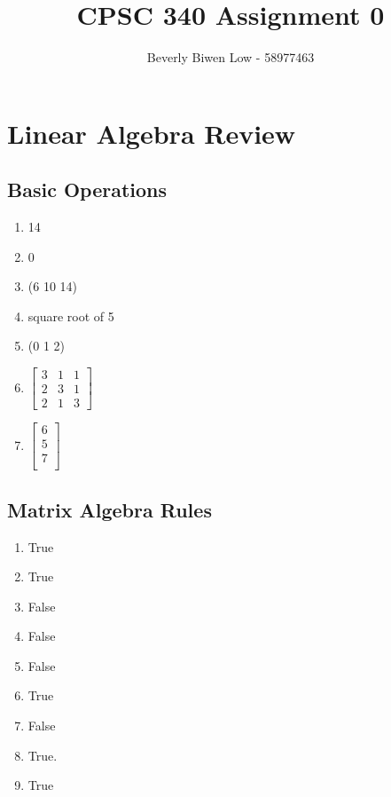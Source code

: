 \documentclass{article}
\def\enum#1{\begin{enumerate}#1\end{enumerate}}
\begin{document}
\title{CPSC 340 Assignment 0}
\author{Beverly Biwen Low - 58977463}
\date{}
\maketitle

\vspace{-4em}



\section{Linear Algebra Review}


\subsection{Basic Operations}

\enum{
\item 14
\item 0
\item (6 10 14)
\item square root of 5
\item (0 1 2)
\item $\left[\begin{array}{ccc}
3 & 1 & 1\\
2 & 3 & 1\\
2 & 1 & 3
\end{array}\right]$
\item $\left[\begin{array}{c}
6\\
5\\
7\\
\end{array}\right]$
}
\subsection{Matrix Algebra Rules}

\begin{enumerate}
\item True
\item True
\item False
\item False
\item False
\item True
\item False
\item True.
\item True
\end{enumerate}
\end{document}
